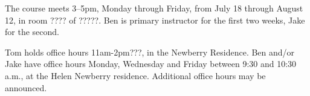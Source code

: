 The course meets 3--5pm, Monday through Friday, from  July 18 through August
12,  in room ???? of ?????.
Ben is primary instructor for the first
two weeks, Jake for the second.  

Tom holds office hours 11am-2pm???, in the Newberry Residence. %
Ben and/or Jake have office hours Monday, Wednesday and
Friday between 9:30 and 10:30 a.m.,
at the Helen Newberry
residence. %
Additional office hours may be announced. 
